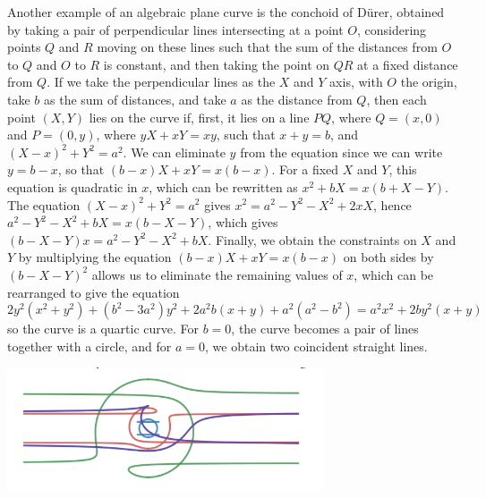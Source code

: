 \begin{example}
    Another example of an algebraic plane curve is the conchoid of D\"{u}rer, obtained by taking a pair of perpendicular lines intersecting at a point $O$, considering points $Q$ and $R$ moving on these lines such that the sum of the distances from $O$ to $Q$ and $O$ to $R$ is constant, and then taking the point on $QR$ at a fixed distance from $Q$. If we take the perpendicular lines as the $X$ and $Y$ axis, with $O$ the origin, take $b$ as the sum of distances, and take $a$ as the distance from $Q$, then each point $(X,Y)$ lies on the curve if, first, it lies on a line $PQ$, where $Q = (x,0)$ and $P = (0,y)$, where $yX + xY = xy$, such that $x + y = b$, and $(X - x)^2 + Y^2 = a^2$. We can eliminate $y$ from the equation since we can write $y = b -x$, so that $(b-x)X + xY = x(b-x)$. For a fixed $X$ and $Y$, this equation is quadratic in $x$, which can be rewritten as $x^2 + bX = x(b + X - Y)$. The equation $(X - x)^2 + Y^2 = a^2$ gives $x^2 = a^2 - Y^2 - X^2 + 2xX$, hence $a^2 - Y^2 - X^2 + bX = x(b - X - Y)$, which gives $(b - X - Y)x = a^2 - Y^2 - X^2 + bX$. Finally, we obtain the constraints on $X$ and $Y$ by multiplying the equation $(b - x)X + xY = x(b - x)$ on both sides by $(b - X - Y)^2$ allows us to eliminate the remaining values of $x$, which can be rearranged to give the equation
    \[ 2y^2(x^2 + y^2) + (b^2 - 3a^2)y^2 + 2a^2b(x + y) + a^2(a^2 - b^2) = a^2x^2 + 2by^2(x + y) \]
    so the curve is a quartic curve. For $b = 0$, the curve becomes a pair of lines together with a circle, and for $a = 0$, we obtain two coincident straight lines.
    \begin{center}
        \includegraphics[width=0.7\textwidth]{ConchoidDurer}
    \end{center}
\end{example}

